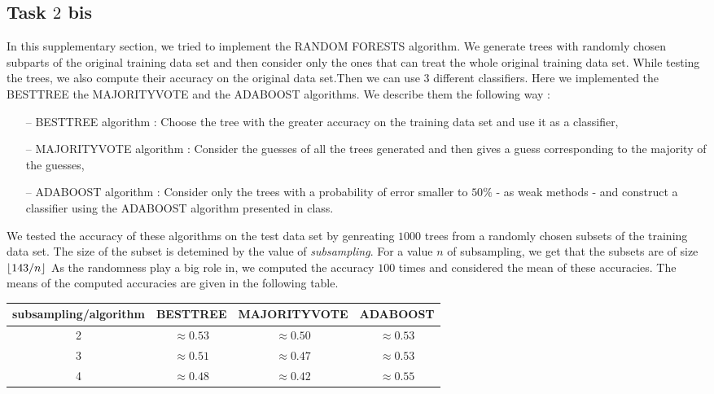 \documentclass[9pt]{extarticle}
\DeclarePairedDelimiter\floor{\lfloor}{\rfloor}
\begin{document}
\subsection{Task $2$ bis}
	In this supplementary section, we tried to implement the RANDOM FORESTS algorithm. We generate trees with randomly chosen subparts of the original training data set and then consider only the ones that can treat the whole original training data set. While testing the trees, we also compute their accuracy on the original data set.Then we can use $3$ different classifiers. Here we implemented the BESTTREE the MAJORITYVOTE and the ADABOOST algorithms. We describe them the following way :
	\begin{itemize}[topsep=0pt,itemsep=0pt,partopsep=0pt, parsep=0pt]
		\item[--] BESTTREE algorithm : Choose the tree with the greater accuracy on the training data set and use it as a classifier,
		\item[--] MAJORITYVOTE algorithm : Consider the guesses of all the trees generated and then gives a guess corresponding to the majority of the guesses,
		\item[--] ADABOOST algorithm : Consider only the trees with a probability of error smaller to $50\%$  - as weak methods - and construct a classifier using the ADABOOST algorithm presented in class.
	\end{itemize}
	We tested the accuracy of these algorithms on the test data set by genreating $1000$ trees from a randomly chosen subsets of the training data set. The size of the subset is detemined by the value of \emph{subsampling}. For a value $n$ of subsampling, we get that the subsets are of size $\floor{143/n}$ As the randomness play a big role in, we computed the accuracy $100$ times and considered the mean of these accuracies. The means of the computed accuracies are given in the following table.
	\begin{center}
		\begin{tabular}{ |c|c|c|c| }
			\hline
			subsampling/algorithm& BESTTREE & MAJORITYVOTE & ADABOOST\\
			\hline
			2 & $\approx 0.53$  & $\approx 0.50$ & $\approx 0.53$ \\
			\hline
			3 & $\approx 0.51 $ & $\approx 0.47$ & $\approx 0.53$ \\
			\hline
			4 & $\approx 0.48$ & $\approx 0.42$ & $\approx 0.55$\\
			\hline
		\end{tabular}
	\end{center}
\end{document}
